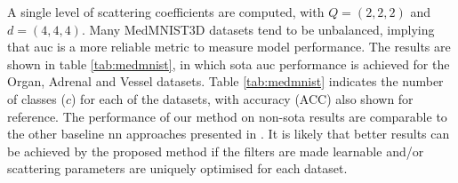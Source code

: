 A single level of scattering coefficients are computed, with $Q = (2, 2, 2)$ and $d = (4, 4, 4)$. Many MedMNIST3D datasets tend to be unbalanced, implying that \ac{auc} is a more reliable metric to measure model performance. The results are shown in table \ref{tab:medmnist}, in which \ac{sota} \ac{auc} performance is achieved for the Organ, Adrenal and Vessel datasets. Table \ref{tab:medmnist} indicates the number of classes ($c$) for each of the datasets, with accuracy (ACC) also shown for reference. The performance of our method on non-\ac{sota} results are comparable to the other baseline \ac{nn} approaches presented in \citep{medmnist}. It is likely that better results can be achieved by the proposed method if the filters are made learnable and/or scattering parameters are uniquely optimised for each dataset.

